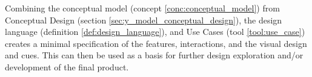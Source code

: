 \begin{definition} \label{def:minimum_system_specification} 
  Combining the conceptual model (concept \ref{conc:conceptual_model}) from Conceptual Design (section \ref{sec:y_model_conceptual_design}), the design language (definition \ref{def:design_language}), and Use Cases (tool \ref{tool:use_case}) creates a minimal specification of the features, interactions, and the visual design and cues. This can then be used as a basis for further design exploration and/or development of the final product.
\end{definition}
